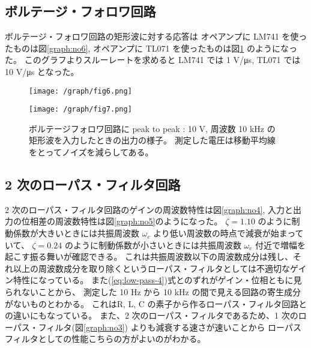 \documentclass[11pt,dvipdfmx,a4paper]{jsarticle}
\begin{document}
\subsection{ボルテージ・フォロワ回路}
ボルテージ・フォロワ回路の矩形波に対する応答は
オペアンプに LM741 を使ったものは図\ref{graph:no6},
オペアンプに TL071 を使ったものは図\ref{graph:no7} のようになった。
このグラフよりスルーレートを求めると
LM741 では 1 V/\si{\micro s},
TL071 では 10 V/\si{\micro s} となった。
\begin{figure}[H]
	\centering
	\begin{minipage}[t]{0.49\columnwidth}
		\centering
		\texttt{[image: /graph/fig6.png]}
		\label{graph:no6}
	\end{minipage}
	\hfill
	\begin{minipage}[t]{0.49\columnwidth}
		\centering
		\texttt{[image: /graph/fig7.png]}
		\label{graph:no7}
	\end{minipage}
	\caption{ボルテージフォロワ回路に peak to peak : 10 V, 周波数 10 kHz の矩形波を入力したときの出力の様子。
	測定した電圧は移動平均線をとってノイズを減らしてある。}
\end{figure}

\subsection{2 次のローパス・フィルタ回路}
2 次のローパス・フィルタ回路のゲインの周波数特性は図\ref{graph:no4},
入力と出力の位相差の周波数特性は図\ref{graph:no5}のようになった。
\(\zeta = 1.10\) のように制動係数が大きいときには共振周波数 \(\omega_c\) より低い周波数の時点で減衰が始まっていて、
\(\zeta = 0.24\) のように制動係数が小さいときには共振周波数 \(\omega_c\) 付近で増幅を起こす振る舞いが確認できる。
これは共振周波数以下の周波数成分は残し、それ以上の周波数成分を取り除くというローパス・フィルタとしては不適切なゲイン特性になっている。
また(\ref{eq:low-pass-4})式とのずれがゲイン・位相ともに見られないことから、
測定した 10 Hz から 10 kHz の間で見える回路の寄生成分がないものとわかる。
これはR, L, C の素子から作るローパス・フィルタ回路との違いにもなっている。
また、2 次のローパス・フィルタであるため、1 次のローパス・フィルタ(図\ref{graph:no3}) よりも減衰する速さが速いことから
ローパスフィルタとしての性能こちらの方がよいのがわかる。
\end{document}
